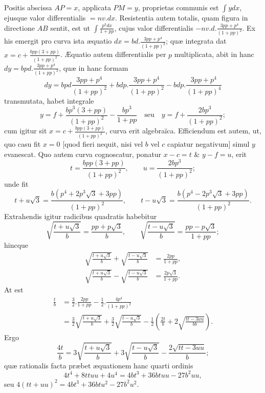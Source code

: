 Positis abscissa $AP=x$, applicata $PM=y$, proprietas communis est $\int ydx$, ejusque valor differentialis $=nv.dx$. Resistentia autem totalis, quam figura in directione $AB$ sentit, est
ut $\int\frac{p^3dx}{1+pp}$, cujus valor differentialis $-nv.d.\frac{3pp+p^4}{(1+pp)^2}$. Ex his emergit pro curva ista æquatio $dx=bd.\frac{3pp+p^4}{(1+pp)^2}$; quæ integrata dat $x=c+\frac{bpp(3+pp)}{(1+pp)^2}$. Æquatio autem differentialis per $p$ multiplicata, abit in hanc $dy=bpd.\frac{3pp+p^4}{(1+pp)^2}$, quæ in hanc formam
\[
dy=bpd\frac{3pp+p^4}{(1+pp)^2}+bdp.\frac{3pp+p^4}{(1+pp)^2}-bdp.\frac{3pp+p^4}{(1+pp)^4}
\]
transmutata, habet integrale
\[
y=f+\frac{bp^3(3+pp)}{(1+pp)^2}-\frac{bp^3}{1+pp}\quad\text{seu}\quad y=f+\frac{2bp^3}{(1+pp)^2};
\]
cum igitur sit $x=c+\frac{bpp(3+pp)}{(1+pp)^2}$, curva erit algebraïca. Efficiendum est autem, ut, quo casu fit $x=0$ [quod fieri nequit, nisi vel $b$ vel $c$ capiatur negativum] simul $y$ evanescat. Quo autem curva cognoscatur, ponatur $x-c=t$ \& $y-f=u$, erit
\[t=\frac{bpp(3+pp)}{(1+pp)^2},\qquad u=\frac{2bp^3}{(1+pp)^2};\]
unde fit
\[
t+u\sqrt3=\frac{b(p^4+2p^3\sqrt3+3pp)}{(1+pp)^2},\qquad
t-u\sqrt3=\frac{b(p^4-2p^3\sqrt3+3pp)}{(1+pp)^2}.
\]
Extrahendis igitur radicibus quadratis habebitur
\[
\sqrt{\frac{t+u\sqrt3}{b}}=\frac{pp+p\sqrt3}{b},\qquad
\sqrt{\frac{t-u\sqrt3}{b}}=\frac{pp-p\sqrt3}{1+pp};
\]
hincque
\[
\begin{aligned}
\sqrt{\frac{t+u\sqrt3}{b}}+\sqrt{\frac{t-u\sqrt3}{b}}&=\frac{2pp}{1+pp},\\
\sqrt{\frac{t+u\sqrt3}{b}}-\sqrt{\frac{t-u\sqrt3}{b}}&=\frac{2p\sqrt3}{1+pp}.
\end{aligned}
\]
At est
\[
\begin{aligned}
\frac tb&=\frac32.\frac{2pp}{1+pp}-\frac12.\frac{4p^4}{(1+pp)^2}\\
&=\frac32\sqrt{\frac{t+u\sqrt3}{b}}+\frac32\sqrt{\frac{t-u\sqrt3}{b}}
-\frac12\left(\frac{2t}b+2\sqrt{\frac{tt-3uu}{bb}}\right).
\end{aligned}
\]
Ergo
\[\frac{4t}b=3\sqrt{\frac{t+u\sqrt3}{b}}+3\sqrt{\frac{t-u\sqrt3}{b}}-\frac{2\sqrt{tt-3uu}}b;\]
quæ rationalis facta præbet æquationem hanc quarti ordinis
\[
4t^4+8ttuu+4u^4=4bt^3+36btuu-27b^2uu,
\]
seu $4(tt+uu)^2=4bt^3+36btu^2-27b^2u^2$.

